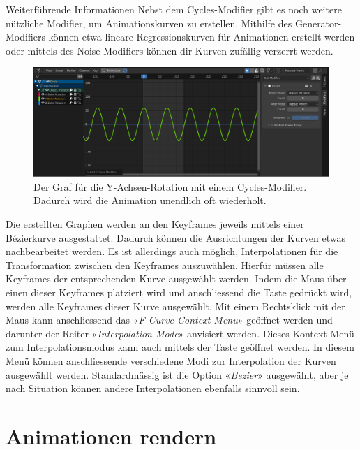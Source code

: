 \documentclass[
]{book}
\let\oldmarginnote\marginnote
\renewcommand{\marginnote}[1]{%
  \oldmarginnote{{\footnotesize\selectfont #1}}%
}
\newcommand{\kbd}[1]{\fbox{\texttt{#1}}}
\begin{document}
\begin{tipp}{Weiterführende Informationen}
Nebst dem Cycles-Modifier gibt es noch weitere nützliche Modifier, um Animationskurven zu erstellen. Mithilfe des Generator-Modifiers können etwa lineare Regressionskurven für Animationen erstellt werden oder mittels des Noise-Modifiers können dir Kurven zufällig verzerrt werden.
\end{tipp}

\begin{figure}

\includegraphics{Chapters/Images/Chapter_48/48_3_Y_Rotation.png}

\caption{\label{fig-1_3}Der Graf für die Y-Achsen-Rotation mit einem
Cycles-Modifier. Dadurch wird die Animation unendlich oft wiederholt.}

\end{figure}%

\marginnote{Kurven-Interpolation anpassen}

Die erstellten Graphen werden an den Keyframes jeweils mittels einer
Bézierkurve ausgestattet. Dadurch können die Ausrichtungen der Kurven
etwas nachbearbeitet werden. Es ist allerdings auch möglich,
Interpolationen für die Transformation zwischen den Keyframes
auszuwählen. Hierfür müssen alle Keyframes der entsprechenden Kurve
ausgewählt werden. Indem die Maus über einen dieser Keyframes platziert
wird und anschliessend die Taste \kbd{L} gedrückt wird, werden alle
Keyframes dieser Kurve ausgewählt. Mit einem Rechtsklick mit der Maus
kann anschliessend das «\emph{F-Curve Context Menu}» geöffnet werden und
darunter der Reiter «\emph{Interpolation Mode}» anvisiert werden. Dieses
Kontext-Menü zum Interpolationsmodus kann auch mittels der Taste \kbd{T}
geöffnet werden. In diesem Menü können anschliessende verschiedene Modi
zur Interpolation der Kurven ausgewählt werden. Standardmässig ist die
Option «\emph{Bezier}» ausgewählt, aber je nach Situation können andere
Interpolationen ebenfalls sinnvoll sein.

\chapter{Animationen rendern}\label{animationen-rendern}
\end{document}
